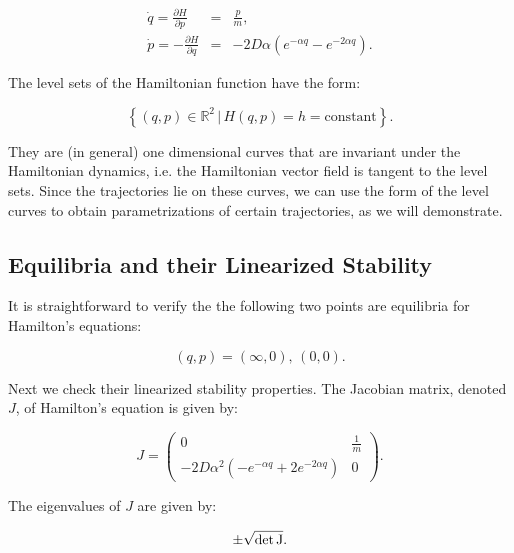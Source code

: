 \documentclass{ws-ijbc}
\begin{document}
\begin{eqnarray}
\dot{q}  =  \frac{\partial H}{\partial p} & = &  \frac{p}{m}, \nonumber \\
\dot{p}  = - \frac{\partial H}{\partial q} %
& = & -2D \alpha \left(e^{-\alpha q} - e^{-2\alpha q}  \right). 
\label{eq:hameq}
\end{eqnarray}

\noindent
The level sets of the Hamiltonian function have the form:

\begin{equation}
\left\{(q, p) \in \mathbb{R}^2 \, | \, H(q, p) = h = \mbox{constant} \right\}.
\label{eq:levelset}
\end{equation}

\noindent
They are (in general) one dimensional curves that are invariant under the Hamiltonian dynamics, i.e. the Hamiltonian vector field is tangent to the level sets. Since the trajectories lie on these curves, we can use the form of the level curves to obtain parametrizations of  certain trajectories, as we will demonstrate.


\subsection{Equilibria and their Linearized Stability}
\label{sec:linstab}


It is straightforward to verify the the following two points are equilibria for Hamilton's equations:



\begin{equation}
(q, p) = (\infty, 0), \, (0, 0).
\label{eq:equil}
\end{equation}

Next we check their linearized stability properties. The Jacobian matrix, denoted $J$, of Hamilton's equation is given by:


\begin{equation}
J = \left(
\begin{array}{cc}
0 & \frac{1}{m} \\
- 2D \alpha^2 \left(- e^{-\alpha q} + 2 e^{-2\alpha q}  \right) & 0
\end{array}
\right).
\label{eq:jac}
\end{equation}

\noindent
The eigenvalues of $J$ are given by:

\begin{equation}
\pm \sqrt{\rm{det}\, J}.
\label{eq:eivs}
\end{equation}
\end{document}
